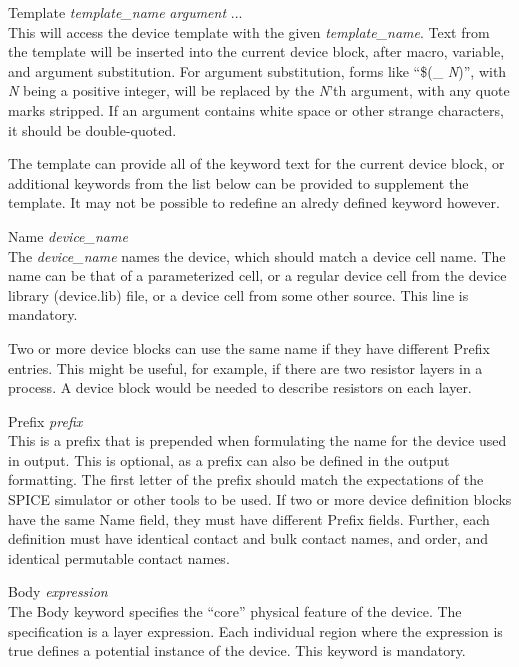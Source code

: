 \begin{description}
\item{\vt Template} {\it template\_name} {\it argument} ...\\
This will access the device template with the given {\it
template\_name}.  Text from the template will be inserted into the
current device block, after macro, variable, and argument
substitution.  For argument substitution, forms like ``{\vt \$(\_}{\it
N\/}{\vt )}'', with {\it N} being a positive integer, will be replaced
by the {\it N\/}'th argument, with any quote marks stripped.  If an
argument contains white space or other strange characters, it should
be double-quoted.

The template can provide all of the keyword text for the current
device block, or additional keywords from the list below can be
provided to supplement the template.  It may not be possible to
redefine an alredy defined keyword however.

\item{\et Name} {\it device\_name}\\
The {\it device\_name} names the device, which should match a device
cell name.  The name can be that of a parameterized cell, or a regular
device cell from the device library ({\vt device.lib}) file, or a
device cell from some other source.  This line is mandatory.

Two or more device blocks can use the same name if they have different
{\et Prefix} entries.  This might be useful, for example, if there are
two resistor layers in a process.  A device block would be needed to
describe resistors on each layer.

\item{\et Prefix} {\it prefix}\\
This is a prefix that is prepended when formulating the name for the
device used in output.  This is optional, as a prefix can also be
defined in the output formatting.  The first letter of the prefix
should match the expectations of the SPICE simulator or other tools to
be used.  If two or more device definition blocks have the same {\et
Name} field, they must have different {\et Prefix} fields.  Further,
each definition must have identical contact and bulk contact names,
and order, and identical permutable contact names.

\item{\et Body} {\it expression}\\
The {\et Body} keyword specifies the ``core'' physical feature of the
device.  The specification is a layer expression.  Each individual
region where the expression is true defines a potential instance of
the device.  This keyword is mandatory.


\end{description}
